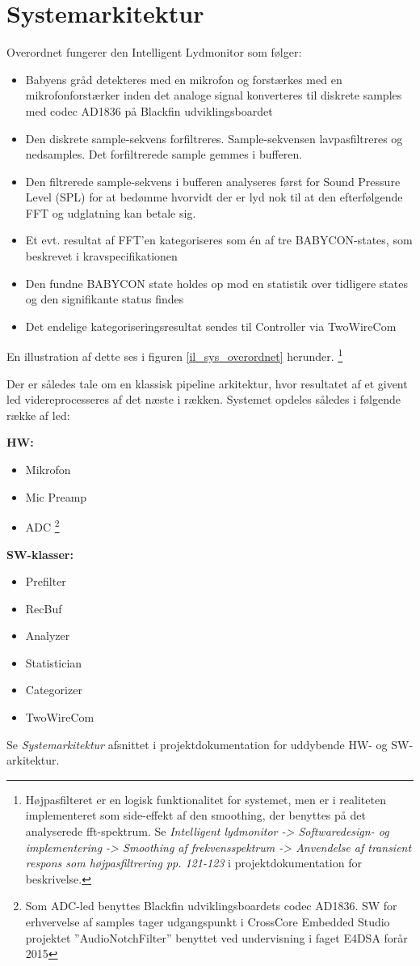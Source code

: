 \section{Systemarkitektur}

Overordnet fungerer den Intelligent Lydmonitor som følger:
\begin{itemize}
	\item Babyens gråd detekteres med en mikrofon og forstærkes med en mikrofonforstærker inden det analoge signal konverteres til diskrete samples med codec AD1836 på Blackfin udviklingsboardet
	\item Den diskrete sample-sekvens forfiltreres. Sample-sekvensen lavpasfiltreres og nedsamples. Det forfiltrerede sample gemmes i bufferen.
	\item Den filtrerede sample-sekvens i bufferen analyseres først for Sound Pressure Level (SPL) for at bedømme hvorvidt der er lyd nok til at den efterfølgende FFT og udglatning kan betale sig. 
	\item Et evt. resultat af FFT'en kategoriseres som én af tre BABYCON-states, som beskrevet i kravspecifikationen 
	\item Den fundne BABYCON state holdes op mod en statistik over tidligere states og den signifikante status findes
	\item Det endelige kategoriseringsresultat sendes til Controller via TwoWireCom
\end{itemize}
En illustration af dette ses i figuren \ref{il_sys_overordnet} herunder. \footnote{Højpasfilteret er en logisk funktionalitet for systemet, men er i realiteten implementeret som side-effekt af den smoothing, der benyttes på det analyserede fft-spektrum. Se \textit{Intelligent lydmonitor -> Softwaredesign- og implementering -> Smoothing af frekvensspektrum -> Anvendelse af transient respons som højpasfiltrering pp. 121-123} i projektdokumentation for beskrivelse.}


Der er således tale om en klassisk pipeline arkitektur, hvor resultatet af et givent led videreprocesseres af det næste i rækken.
Systemet opdeles således i følgende række af led:

\textbf{HW:} 
\begin{itemize}
\item Mikrofon
\item Mic Preamp
\item ADC \footnote{Som ADC-led benyttes Blackfin udviklingsboardets codec AD1836. SW for erhvervelse af samples tager udgangspunkt i CrossCore Embedded Studio projektet ''AudioNotchFilter'' benyttet ved undervisning i faget E4DSA forår 2015}
\end{itemize}

\textbf{SW-klasser:} 
\begin{itemize}
\item Prefilter
\item RecBuf
\item Analyzer
\item Statistician
\item Categorizer
\item TwoWireCom
\end{itemize}
Se \textit{Systemarkitektur} afsnittet i projektdokumentation for uddybende HW- og SW-arkitektur.

